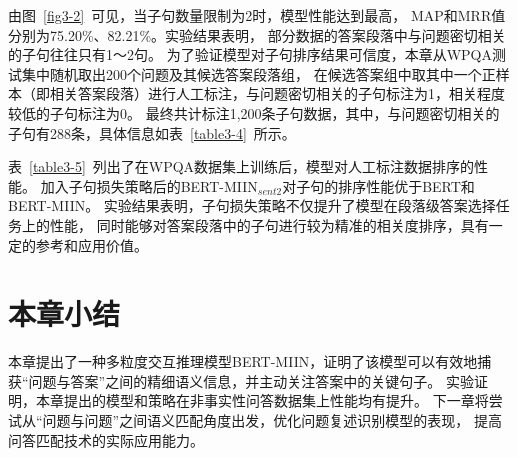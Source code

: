 

由图~\ref{fig3-2}~可见，当子句数量限制为2时，模型性能达到最高，
MAP和MRR值分别为75.20\%、82.21\%。实验结果表明，
部分数据的答案段落中与问题密切相关的子句往往只有1～2句。
为了验证模型对子句排序结果可信度，本章从WPQA测试集中随机取出200个问题及其候选答案段落组，
在候选答案组中取其中一个正样本（即相关答案段落）进行人工标注，与问题密切相关的子句标注为1，相关程度较低的子句标注为0。
最终共计标注1,200条子句数据，其中，与问题密切相关的子句有288条，具体信息如表~\ref{table3-4}~所示。



表~\ref{table3-5}~列出了在WPQA数据集上训练后，模型对人工标注数据排序的性能。
加入子句损失策略后的BERT-MIIN$_{sent2}$对子句的排序性能优于BERT和BERT-MIIN。
实验结果表明，子句损失策略不仅提升了模型在段落级答案选择任务上的性能，
同时能够对答案段落中的子句进行较为精准的相关度排序，具有一定的参考和应用价值。



\section{本章小结}

本章提出了一种多粒度交互推理模型BERT-MIIN，证明了该模型可以有效地捕获“问题与答案”之间的精细语义信息，并主动关注答案中的关键句子。
实验证明，本章提出的模型和策略在非事实性问答数据集上性能均有提升。
下一章将尝试从“问题与问题”之间语义匹配角度出发，优化问题复述识别模型的表现，
提高问答匹配技术的实际应用能力。




